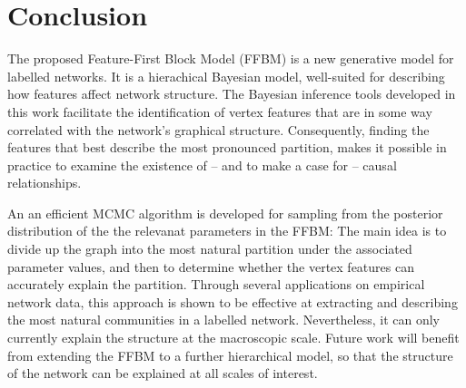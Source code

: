 \section{Conclusion}
\label{sec:conclusion}

The proposed Feature-First Block Model (FFBM)
is a new generative model for labelled networks.
It is a hierachical Bayesian model, 
well-suited for describing how features
affect network structure.
The Bayesian inference tools developed in this 
work facilitate the identification of 
vertex features that are in some way 
correlated with the network's graphical structure.
Consequently, 
finding the features that best describe the most 
pronounced partition, makes it possible in practice
to examine the existence of -- and to make a case for --
causal relationships.

An an efficient MCMC algorithm 
is developed for sampling 
from the posterior distribution of the
the relevanat parameters in the FFBM:
The main idea is to divide up the graph into 
the most natural partition under the associated
parameter values, and then to determine whether 
the vertex features can accurately explain the partition. 
Through several applications on empirical
network data, this approach 
is shown to be effective at extracting and describing 
the most natural communities in a labelled network. 
Nevertheless, it
can only currently explain the structure at the macroscopic
scale. Future work will benefit from extending 
the FFBM to a further hierarchical model,
so that
the structure of the network 
can be explained at all scales of interest.


